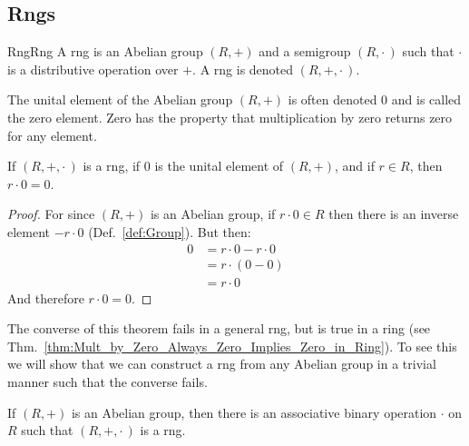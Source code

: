     \subsection{Rngs}
        \begin{fdefinition}{Rng}{Rng}
            A \gls{rng} is an \gls{Abelian group} $(R,+)$ and a \gls{semigroup}
            $(R,\cdot\,)$ such that $\cdot$ is a \gls{distributive operation}
            over $+$. A rng is denoted $(R,+,\cdot\,)$.
        \end{fdefinition}
        The unital element of the Abelian group $(R,+)$ is often denoted 0 and
        is called the zero element. Zero has the property that multiplication by
        zero returns zero for any element.
        \begin{theorem}
            \label{thm:Mult_By_Zero_in_Rng}%
            If $(R,+,\cdot\,)$ is a rng, if 0 is the unital element of $(R,+)$,
            and if $r\in{R}$, then $r\cdot{0}=0$.
        \end{theorem}
        \begin{proof}
            For since $(R,+)$ is an Abelian group, if $r\cdot{0}\in{R}$ then
            there is an inverse element $\minus{r}\cdot{0}$
            (Def.~\ref{def:Group}). But then:
            \begin{align}
                0&=r\cdot{0}-r\cdot{0}
                \tag{Inverse Property of Groups}\\
                &=r\cdot(0-0)
                \tag{Distributive Property}\\
                &=r\cdot{0}
                \tag{Identity Property}
            \end{align}
            And therefore $r\cdot{0}=0$.
        \end{proof}
        The converse of this theorem fails in a general rng, but is true in a
        ring (see Thm.~\ref{thm:Mult_by_Zero_Always_Zero_Implies_Zero_in_Ring}).
        To see this we will show that we can construct a rng from any Abelian
        group in a trivial manner such that the converse fails.
        \begin{theorem}
            \label{thm:rng_induced_by_Abelian_group}%
            If $(R,+)$ is an Abelian group, then there is an associative
            binary operation $\cdot$ on $R$ such that $(R,+,\cdot\,)$ is a rng.
        \end{theorem}
